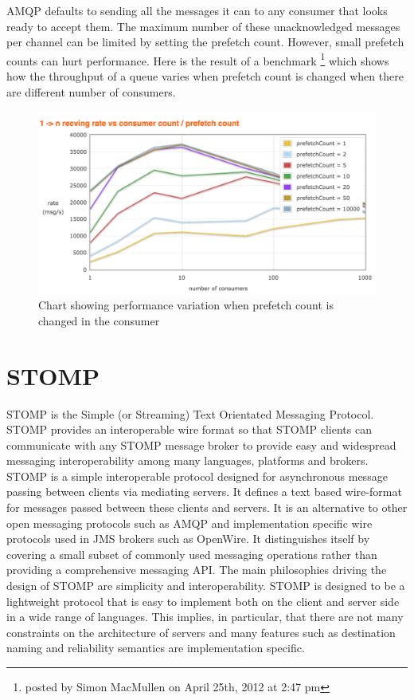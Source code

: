 AMQP defaults to sending all the messages it can to any consumer that looks ready to accept them. The maximum number of these unacknowledged messages per channel can be limited by setting the prefetch count. However, small prefetch counts can hurt performance. Here is the result of a benchmark \footnote{posted by Simon MacMullen on April 25th, 2012 at 2:47 pm} which shows how the throughput of a queue varies when prefetch count is changed when there are different number of consumers.
\begin{figure}[H]
  \centering
  \includegraphics[width=1\textwidth]{figures/rabbitmqPrefetch}
  \caption[rabbitPerformance]{Chart showing performance variation when prefetch count is changed in the consumer\footnotemark}
\end{figure}

\section{STOMP}
\label{sec:stomp}
STOMP is the Simple (or Streaming) Text Orientated Messaging Protocol.
STOMP provides an interoperable wire format so that STOMP clients can communicate with any STOMP message broker to provide easy and widespread messaging interoperability among many languages, platforms and brokers. ~\parencite{stomp}
STOMP is a simple interoperable protocol designed for asynchronous message passing between clients via mediating servers. It defines a text based wire-format for messages passed between these clients and servers.
It is an alternative to other open messaging protocols such as AMQP and implementation specific wire protocols used in JMS brokers such as OpenWire. It distinguishes itself by covering a small subset of commonly used messaging operations rather than providing a comprehensive messaging API.
The main philosophies driving the design of STOMP are simplicity and interoperability.
STOMP is designed to be a lightweight protocol that is easy to implement both on the client and server side in a wide range of languages. This implies, in particular, that there are not many constraints on the architecture of servers and many features such as destination naming and reliability semantics are implementation specific.
